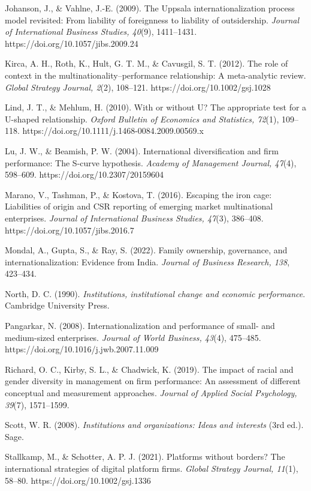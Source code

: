 \documentclass[
  12pt,a4paper]{article}
\begin{document}
Johanson, J., \& Vahlne, J.-E. (2009). The Uppsala internationalization
process model revisited: From liability of foreignness to liability of
outsidership. \emph{Journal of International Business Studies, 40}(9),
1411--1431. https://doi.org/10.1057/jibs.2009.24

Kirca, A. H., Roth, K., Hult, G. T. M., \& Cavusgil, S. T. (2012). The
role of context in the multinationality--performance relationship: A
meta-analytic review. \emph{Global Strategy Journal, 2}(2), 108--121.
https://doi.org/10.1002/gsj.1028

Lind, J. T., \& Mehlum, H. (2010). With or without U? The appropriate
test for a U-shaped relationship. \emph{Oxford Bulletin of Economics and
Statistics, 72}(1), 109--118.
https://doi.org/10.1111/j.1468-0084.2009.00569.x

Lu, J. W., \& Beamish, P. W. (2004). International diversification and
firm performance: The S-curve hypothesis. \emph{Academy of Management
Journal, 47}(4), 598--609. https://doi.org/10.2307/20159604

Marano, V., Tashman, P., \& Kostova, T. (2016). Escaping the iron cage:
Liabilities of origin and CSR reporting of emerging market multinational
enterprises. \emph{Journal of International Business Studies, 47}(3),
386--408. https://doi.org/10.1057/jibs.2016.7

Mondal, A., Gupta, S., \& Ray, S. (2022). Family ownership, governance,
and internationalization: Evidence from India. \emph{Journal of Business
Research, 138}, 423--434.

North, D. C. (1990). \emph{Institutions, institutional change and
economic performance}. Cambridge University Press.

Pangarkar, N. (2008). Internationalization and performance of small- and
medium-sized enterprises. \emph{Journal of World Business, 43}(4),
475--485. https://doi.org/10.1016/j.jwb.2007.11.009

Richard, O. C., Kirby, S. L., \& Chadwick, K. (2019). The impact of
racial and gender diversity in management on firm performance: An
assessment of different conceptual and measurement approaches.
\emph{Journal of Applied Social Psychology, 39}(7), 1571--1599.

Scott, W. R. (2008). \emph{Institutions and organizations: Ideas and
interests} (3rd ed.). Sage.

Stallkamp, M., \& Schotter, A. P. J. (2021). Platforms without borders?
The international strategies of digital platform firms. \emph{Global
Strategy Journal, 11}(1), 58--80. https://doi.org/10.1002/gsj.1336
\end{document}
